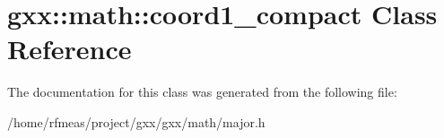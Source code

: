 \hypertarget{classgxx_1_1math_1_1coord1__compact}{}\section{gxx\+:\+:math\+:\+:coord1\+\_\+compact Class Reference}
\label{classgxx_1_1math_1_1coord1__compact}


The documentation for this class was generated from the following file\+:\begin{DoxyCompactItemize}
\item 
/home/rfmeas/project/gxx/gxx/math/major.\+h\end{DoxyCompactItemize}
